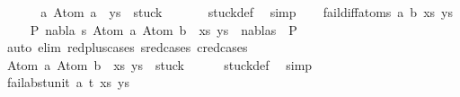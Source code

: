\begin{isabellebody}
\ \ \isamarkupfalse%
\ \isamarkupfalse%
\ {\isachardoublequoteopen}{\isacharparenleft}{\kern0pt}{\isacharbrackleft}{\kern0pt}{\isacharbrackright}{\kern0pt}{\isacharcomma}{\kern0pt}\ {\isacharparenleft}{\kern0pt}a{\isacharcomma}{\kern0pt}\ Atom\ a{\isacharparenright}{\kern0pt}\ {\isacharhash}{\kern0pt}\ ys{\isacharparenright}{\kern0pt}\ {\isasymin}\ stuck{\isachardoublequoteclose}\ \isanewline
\ \ \ \ \isamarkupfalse%
\ stuck{\isacharunderscore}{\kern0pt}def\ \isamarkupfalse%
\ simp\isanewline
{}\isamarkupfalse%
\isanewline
\ \ \isamarkupfalse%
\ {\isacharparenleft}{\kern0pt}fail{\isacharunderscore}{\kern0pt}diff{\isacharunderscore}{\kern0pt}atoms\ a\ b\ xs\ ys{\isacharparenright}{\kern0pt}\isanewline
\ \ \isamarkupfalse%
\ {\isachardoublequoteopen}{\isasymnot}\ {\isacharparenleft}{\kern0pt}{\isasymexists}P{}\ nabla\ s{\isachardot}{\kern0pt}\ {\isacharparenleft}{\kern0pt}{\isacharparenleft}{\kern0pt}Atom\ a{\isacharcomma}{\kern0pt}\ Atom\ b{\isacharparenright}{\kern0pt}\ {\isacharhash}{\kern0pt}\ xs{\isacharcomma}{\kern0pt}\ ys{\isacharparenright}{\kern0pt}\ {\isasymTurnstile}\ {\isacharparenleft}{\kern0pt}nabla{\isacharcomma}{\kern0pt}s{\isacharparenright}{\kern0pt}\ {\isasymRightarrow}\ P{}{\isacharparenright}{\kern0pt}{\isachardoublequoteclose}\isanewline
\ \ \ \ \isamarkupfalse%
\ {\isacharparenleft}{\kern0pt}auto\ elim{\isacharcolon}{\kern0pt}\ red{\isacharunderscore}{\kern0pt}plus{\isachardot}{\kern0pt}cases\ s{\isacharunderscore}{\kern0pt}red{\isachardot}{\kern0pt}cases\ c{\isacharunderscore}{\kern0pt}red{\isachardot}{\kern0pt}cases{\isacharparenright}{\kern0pt}\isanewline
\ \ \isamarkupfalse%
\ \isamarkupfalse%
\ {\isachardoublequoteopen}{\isacharparenleft}{\kern0pt}{\isacharparenleft}{\kern0pt}Atom\ a{\isacharcomma}{\kern0pt}\ Atom\ b{\isacharparenright}{\kern0pt}\ {\isacharhash}{\kern0pt}\ xs{\isacharcomma}{\kern0pt}\ ys{\isacharparenright}{\kern0pt}\ {\isasymin}\ stuck{\isachardoublequoteclose}\isanewline
\ \ \ \ \isamarkupfalse%
\ stuck{\isacharunderscore}{\kern0pt}def\ \isamarkupfalse%
\ simp\isanewline
{}\isamarkupfalse%
\isanewline
\ \ \isamarkupfalse%
\ {\isacharparenleft}{\kern0pt}fail{\isacharunderscore}{\kern0pt}abst{\isacharunderscore}{\kern0pt}unit\ a\ t\ xs\ ys{\isacharparenright}{\kern0pt}\isanewline
\ \ \isamarkupfalse%

\end{isabellebody}
